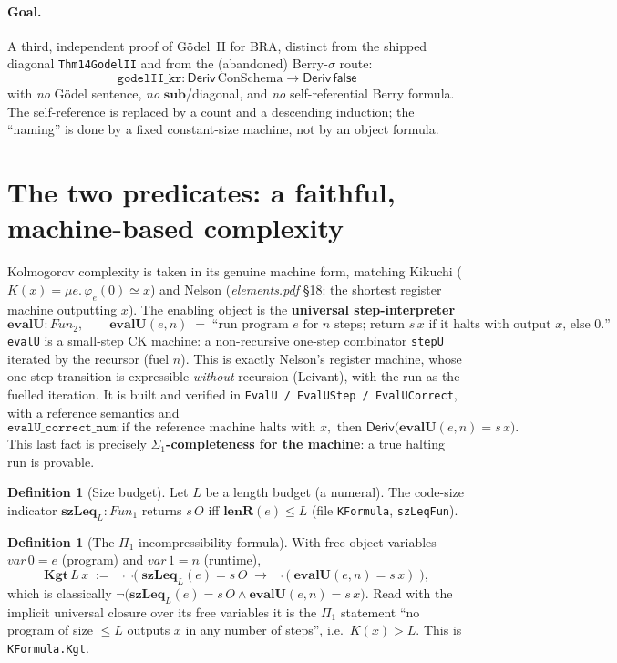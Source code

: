 \documentclass[11pt]{article}
\theoremstyle{plain}
\theoremstyle{definition}
\newtheorem{definition}[theorem]{Definition}
\theoremstyle{remark}
\newcommand{\evalU}{\mathbf{evalU}}
\newcommand{\lenR}{\mathbf{lenR}}
\newcommand{\Deriv}{\mathsf{Deriv}}
\newcommand{\Kgt}{\mathbf{Kgt}}
\newcommand{\false}{\mathsf{false}}
\newcommand{\sze}{\mathbf{szLeq}}
\begin{document}
\paragraph{Goal.} A third, independent proof of G\"odel~II for BRA, distinct from
the shipped diagonal \texttt{Thm14GodelII} and from the (abandoned) Berry-$\sigma$
route:
\[
  \boxed{\;\texttt{godelII\_kr} : \Deriv\,\mathrm{ConSchema} \longrightarrow \Deriv\,\false\;}
\]
with \emph{no} G\"odel sentence, \emph{no} $\mathbf{sub}$/diagonal, and \emph{no}
self-referential Berry formula. The self-reference is replaced by a count and a
descending induction; the ``naming'' is done by a fixed constant-size machine, not
by an object formula.

\section{The two predicates: a faithful, machine-based complexity}

Kolmogorov complexity is taken in its genuine machine form, matching Kikuchi
($K(x)=\mu e.\,\varphi_e(0)\simeq x$) and Nelson (\emph{elements.pdf} \S18: the
shortest register machine outputting $x$). The enabling object is the
\textbf{universal step-interpreter}
\[
  \evalU : \mathit{Fun}_2, \qquad \evalU(e,n) \;=\; \text{``run program $e$ for
  $n$ steps; return $s\,x$ if it halts with output $x$, else $0$.''}
\]
\texttt{evalU} is a small-step CK machine: a non-recursive one-step combinator
\texttt{stepU} iterated by the recursor (fuel $n$). This is exactly Nelson's
register machine, whose one-step transition is expressible \emph{without}
recursion (Leivant), with the run as the fuelled iteration. It is built and
verified in \texttt{EvalU\,/\,EvalUStep\,/\,EvalUCorrect}, with a reference
semantics and
\[
  \texttt{evalU\_correct\_num} : \text{if the reference machine halts with } x,
  \text{ then } \Deriv\big(\evalU(e,n) = s\,x\big).
\]
This last fact is precisely \textbf{$\Sigma_1$-completeness for the machine}: a
true halting run is provable.

\begin{definition}[Size budget]
Let $L$ be a length budget (a numeral). The code-size indicator
$\sze_L : \mathit{Fun}_1$ returns $s\,O$ iff $\lenR(e) \le L$ (file
\texttt{KFormula}, \texttt{szLeqFun}).
\end{definition}

\begin{definition}[The $\Pi_1$ incompressibility formula]
With free object variables $\mathit{var}\,0 = e$ (program) and
$\mathit{var}\,1 = n$ (runtime),
\[
  \Kgt\,L\,x \;:=\; \neg\neg\big(\;\sze_L(e)=s\,O \;\rightarrow\;
  \neg(\evalU(e,n)=s\,x)\;\big),
\]
which is classically $\neg\big(\sze_L(e)=s\,O \wedge \evalU(e,n)=s\,x\big)$.
Read with the implicit universal closure over its free variables it is the
$\Pi_1$ statement ``no program of size $\le L$ outputs $x$ in any number of
steps'', i.e.\ $K(x) > L$. This is \texttt{KFormula.Kgt}.
\end{definition}
\end{document}
